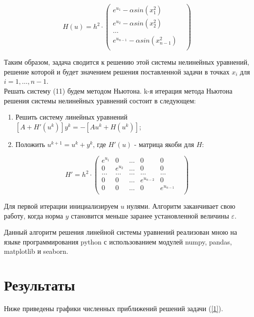 \documentclass[a4paper,11.9pt]{article}
\begin{document}
\begin{equation}
    H(u) = h^2 \cdot
    \begin{pmatrix}
        e^{u_1} - \alpha sin(x_1^2)&\\
        e^{u_2} - \alpha sin(x_2^2)&\\
        \ldots&\\
        e^{u_{n-1}} - \alpha sin(x_{n-1}^2)&\\
    \end{pmatrix}
\end{equation}

Таким образом, задача сводится к решению этой системы нелинейных уравнений, решение которой и будет значением решения поставленной задачи в точках $x_i$ для $i = 1,\ldots,n-1$.\\
Решать систему (11) будем методом Ньютона. k-я итерация метода Ньютона решения системы нелинейных уравнений состоит в следующем:
\begin{enumerate}
    \item Решить систему линейных уравнений $[A + H'(u^k)]y^k = -[Au^k + H(u^k)]$;
    \item Положить $u^{k+1} = u^k + y^k$, где $H'(u)$ - матрица якоби для $H$:
\end{enumerate}

\begin{equation}
    H' = h^2 \cdot
    \begin{pmatrix}
        e^{u_1}& 0&  \ldots& 0& 0&\\
        0& e^{u_2}&  \ldots& 0& 0&\\
        \ldots& \ldots& \ldots& \ldots& \ldots&\\
        0& 0&  \ldots& e^{u_{n-2}}& 0&\\
        0& 0& \ldots& 0& e^{u_{n-1}}&\\
    \end{pmatrix}
\end{equation}

Для первой итерации инициализируем $u$ нулями.
Алгоритм заканчивает свою работу, когда норма $y$ становится меньше заранее установленной величины $\varepsilon$.

Данный алгоритм решения линейной системы уравнений реализован мною на языке программирования python с использованием модулей numpy, pandas, matplotlib и seaborn.
\newpage
\section*{\centering Результаты} \Large 
Ниже приведены графики численных приближений решений задачи (\ref{1}).
\end{document}
